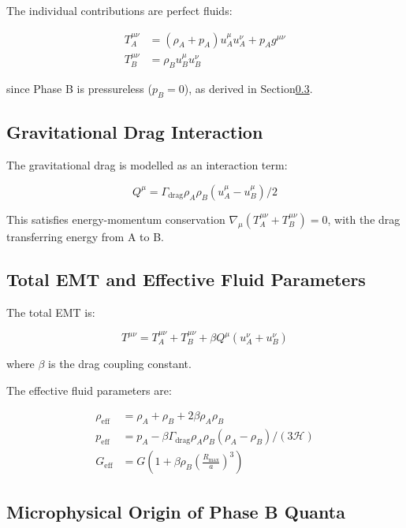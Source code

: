 \documentclass[10pt,twocolumn]{article}
\theoremstyle{definition}
\newcommand{\Rmax}{R_{\max}}
\newcommand{\rhoA}{\rho_{A}}
\newcommand{\rhoB}{\rho_{B}}
\newcommand{\Hcal}{\mathcal{H}}
\newcommand{\Gammadrag}{\Gamma_{\mathrm{drag}}}
\begin{document}
The individual contributions are perfect fluids:

\begin{align}
  T_{A}^{\mu\nu} &= (\rhoA + p_{A}) u_{A}^{\mu} u_{A}^{\nu} + p_{A} g^{\mu\nu} \\
  T_{B}^{\mu\nu} &= \rhoB u_{B}^{\mu} u_{B}^{\nu}
\end{align}

since Phase B is pressureless (\( p_{B} = 0 \)), as derived in Section\nobreakspace{}\ref{sec:phaseB-micro}.

\subsection{Gravitational Drag Interaction}

The gravitational drag is modelled as an interaction term:

\begin{equation}
  Q^{\mu} = \Gammadrag \rhoA \rhoB (u_{A}^{\mu} - u_{B}^{\mu}) / 2
\end{equation}

This satisfies energy-momentum conservation \( \nabla_{\mu} (T_{A}^{\mu\nu} + T_{B}^{\mu\nu}) = 0 \), with the drag transferring energy from A to B.

\subsection{Total EMT and Effective Fluid Parameters}

The total EMT is:

\begin{equation}
  T^{\mu\nu} = T_{A}^{\mu\nu} + T_{B}^{\mu\nu} + \beta Q^{\mu} (u_{A}^{\nu} + u_{B}^{\nu})
  \label{eq:total-emt}
\end{equation}%


where \( \beta \) is the drag coupling constant.

The effective fluid parameters are:

\begin{align}
  \rho_{\mathrm{eff}} &= \rhoA + \rhoB + 2 \beta \rhoA \rhoB \\
  p_{\mathrm{eff}} &= p_{A} - \beta \Gammadrag \rhoA \rhoB (\rhoA - \rhoB) / (3 \Hcal) \\
  G_{\mathrm{eff}} &= G \left(1 + \beta \rhoB \left(\frac{\Rmax}{a}\right)^{3}\right)
\end{align}%


\subsection{Microphysical Origin of Phase B Quanta}
\label{sec:phaseB-micro}
\end{document}
